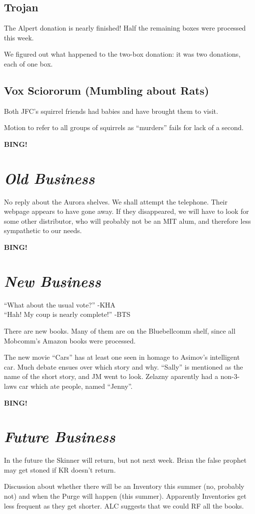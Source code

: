 \documentclass[10pt]{article}
\newcommand{\bing}{{\bf BING!} }
\newcommand{\goto}[1]{\bing \vskip 12pt \section*{{\em{#1}}}}
\begin{document}
\subsection*{Trojan}
The Alpert donation is nearly finished! Half the remaining boxes were
processed this week.

We figured out what happened to the two-box donation: it was two
donations, each of one box.



\subsection*{Vox Sciororum (Mumbling about Rats)}
Both JFC's squirrel friends had babies and have brought them to visit.

Motion to refer to all groups of squirrels as ``murders'' fails for lack of a second.

\goto{Old Business}
No reply about the Aurora shelves.  We shall attempt the
telephone. Their webpage appears to have gone away. If they
disappeared, we will have to look for some other distributor, who will
probably not be an MIT alum, and therefore less sympathetic to our
needs.

\goto{New Business}
``What about the usual vote?'' -KHA\\
``Hah! My coup is nearly complete!'' -BTS

There are new books. Many of them are on the Bluebellcomm shelf, since
all Mobcomm's Amazon books were processed.

The new movie ``Cars'' has at least one seen in homage to Asimov's
intelligent car. Much debate ensues over which story and why.
``Sally'' is mentioned as the name of the short story, and JM went to
look. Zelazny aparently had a non-3-laws car which ate people, named ``Jenny''.

\goto{Future Business}
In the future the Skinner will return, but not next week.
Brian the false prophet may get stoned if KR doesn't return.

Discussion about whether there will be an Inventory this summer (no,
probably not) and when the Purge will happen (this summer). Apparently
Inventories get less frequent as they get shorter. ALC suggests that
we could RF all the books.
\end{document}
